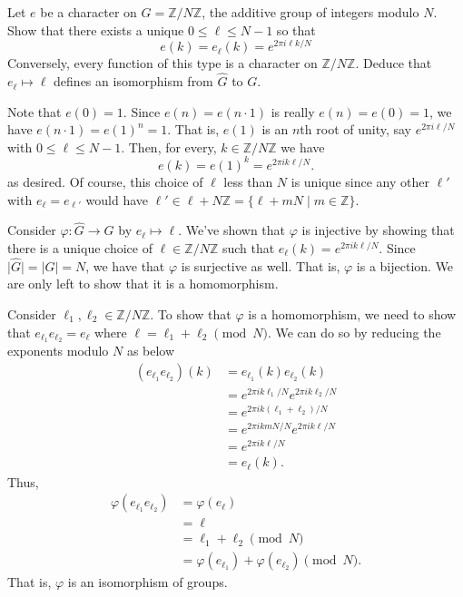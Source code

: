 \documentclass[12 pt, letterpaper]{hmcpset}
\begin{document}
\pagebreak

\begin{problem}[S \& S \S 7.3 \#4]
	Let $e$ be a character on $G = \mathbb{Z} / N \mathbb{Z}$, the additive group of integers modulo $N$. Show that there exists a unique $0 \le \ell \le N - 1$ so that
	\[
		e(k) = e_{\ell}(k) = e^{2 \pi i \ell k / N}
	\]
	Conversely, every function of this type is a character on $\mathbb{Z} / N \mathbb{Z}$. Deduce that $e_{\ell} \mapsto \ell$ defines an isomorphism from $\widehat{G}$ to $G$.
\end{problem}

\begin{solution}
	Note that $e(0) = 1$. Since $e(n) = e(n \cdot 1)$ is really $e(n) = e(0) = 1$, we have $e(n \cdot 1) = e(1)^{n} = 1$. That is, $e(1)$ is an $n$th root of unity, say $e^{2 \pi i \ell / N}$ with $0 \le \ell \le N - 1$. Then, for every, $k \in \mathbb{Z} / N \mathbb{Z}$ we have
	\[
		e(k) = e(1)^{k} = e^{2 \pi i k \ell / N}.
	\]
	as desired. Of course, this choice of $\ell$ less than $N$ is unique since any other $\ell'$ with $e_{\ell} = e_{\ell'}$ would have $\ell' \in \ell + N\mathbb{Z} = \{ \ell + m N \mid m \in \mathbb{Z} \}$.

	Consider $\varphi : \widehat{G} \to G$ by $e_{\ell} \mapsto \ell$. We've shown that $\varphi$ is injective by showing that there is a unique choice of $\ell \in \mathbb{Z} / N \mathbb{Z}$ such that $e_{\ell}(k) = e^{2 \pi i k \ell / N}$. Since $\lvert \widehat{G} \rvert = \lvert G \rvert = N$, we have that $\varphi$ is surjective as well. That is, $\varphi$ is a bijection. We are only left to show that it is a homomorphism.

	Consider $\ell_{1}, \ell_{2} \in \mathbb{Z} / N \mathbb{Z}$. To show that $\varphi$ is a homomorphism, we need to show that $e_{\ell_{1}} e_{\ell_{2}} = e_{\ell}$ where $\ell = \ell_{1} + \ell_{2} \pmod N$. We can do so by reducing the exponents modulo $N$ as below
	\begin{align*}
		(e_{\ell_{1}} e_{\ell_{2}})(k) & = e_{\ell_{1}}(k) e_{\ell_{2}}(k) \\
					       & = e^{2 \pi i k \ell_{1} / N} e^{2 \pi i k \ell_{2} / N} \\
					       & = e^{2 \pi i k (\ell_{1} + \ell_{2}) / N} \\
					       & = e^{2 \pi i k m N / N} e^{2 \pi i k \ell / N} \\
					       & = e^{2 \pi i k \ell / N} \\
					       & = e_{\ell}(k).
	\end{align*}
	Thus,
	\begin{align*}
		\varphi(e_{\ell_{1}} e_{\ell_{2}}) & = \varphi(e_{\ell}) \\
						   & = \ell \\
				     & = \ell_{1} + \ell_{2} \pmod N \\
				     & = \varphi(e_{\ell_{1}}) + \varphi(e_{\ell_{2}}) \pmod N.
	\end{align*}
	That is, $\varphi$ is an isomorphism of groups.
\end{solution}
\end{document}

